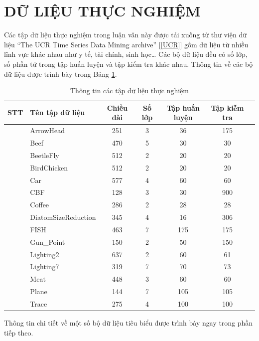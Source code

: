 \documentclass[13pt,oneside]{scrbook}
\newcounter{magicrownumbers}
\newcommand\rownumber{\stepcounter{magicrownumbers}\arabic{magicrownumbers}}
\begin{document}
\section{DỮ LIỆU THỰC NGHIỆM}
Các tập dữ liệu thực nghiệm trong luận văn này được tải xuống từ thư viện dữ liệu “The UCR Time Series Data Mining archive” [\ref{UCR}] gồm dữ liệu từ nhiều lĩnh vực khác nhau như y tế, tài chính, sinh học… Các bộ dữ liệu đều có số lớp, số phần tử trong tập huấn luyện và tập kiểm tra khác nhau.
Thông tin về các bộ dữ liệu được trình bày trong Bảng \ref{tab:dataset}.
\begin{table}[!htb]
\centering
    \begin{tabular}{| c | l | c | c | c | c | c}
    \hline
	STT & Tên tập dữ liệu & Chiều dài & Số lớp & Tập huấn luyện & Tập kiễm tra\\ \hline
    \rownumber & ArrowHead & 251 & 3 & 36 & 175\\ \hline
    \rownumber & Beef & 470 & 5 & 30 & 30\\ \hline
    \rownumber & BeetleFly & 512 & 2 & 20 & 20\\ \hline
    \rownumber & BirdChicken & 512 & 2 & 20 & 20\\ \hline
    \rownumber & Car & 577 & 4 & 60 & 60\\ \hline
    \rownumber & CBF & 128 & 3 & 30 & 900\\ \hline
    \rownumber & Coffee & 286 & 2 & 28 & 28\\ \hline
    \rownumber & DiatomSizeReduction & 345 & 4 & 16 & 306\\ \hline
    \rownumber & FISH & 463 & 7 & 175 & 175\\ \hline
    \rownumber & Gun\_Point & 150 & 2 & 50 & 150\\ \hline
    \rownumber & Lighting2 & 637 & 2 & 60 & 61\\ \hline
    \rownumber & Lighting7 & 319 & 7 & 70 & 73\\ \hline
    \rownumber & Meat & 448 & 3 & 60 & 60\\ \hline
    \rownumber & Plane & 144 & 7 & 105 & 105\\ \hline
    \rownumber & Trace & 275 & 4 & 100 & 100\\ \hline
	
    \end{tabular}
    \caption{Thông tin các tập dữ liệu thực nghiệm}\label{tab:dataset}
\end{table}
Thông tin chi tiết về một số bộ dữ liệu tiêu biểu được trình bày ngay trong phần tiếp theo.
\end{document}
